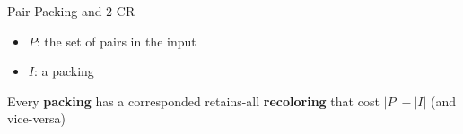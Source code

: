\begin{frame}{Pair Packing and 2-CR}

\begin{itemize}
\boldmath
\item 
$P$: the set of pairs in the input

\pause\item
$I$: a packing


\end{itemize}
\pause 
\begin{observation}
Every \textbf{packing} has a corresponded retains-all \textbf{recoloring} that cost 
$|P| - |I|$ (and vice-versa)
\end{observation}

\end{frame}